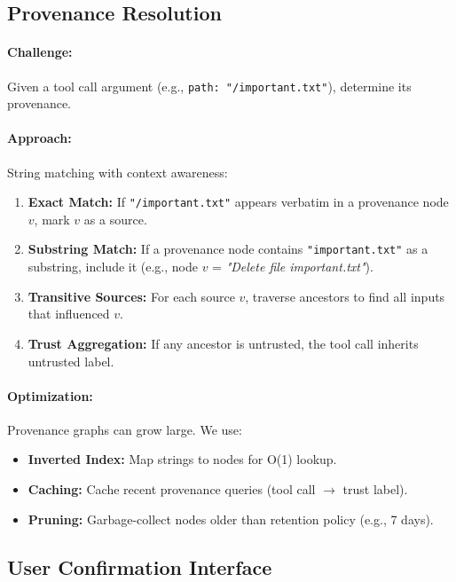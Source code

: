 \subsection{Provenance Resolution}

\paragraph{Challenge:} Given a tool call argument (e.g., \texttt{path: "/important.txt"}), determine
its provenance.

\paragraph{Approach:} String matching with context awareness:
\begin{enumerate}[leftmargin=1.2em]
  \item \textbf{Exact Match:} If \texttt{"/important.txt"} appears verbatim in a provenance node
        $v$, mark $v$ as a source.
  \item \textbf{Substring Match:} If a provenance node contains \texttt{"important.txt"} as a
        substring, include it (e.g., node $v$ = \textit{"Delete file important.txt"}).
  \item \textbf{Transitive Sources:} For each source $v$, traverse ancestors to find all inputs
        that influenced $v$.
  \item \textbf{Trust Aggregation:} If any ancestor is untrusted, the tool call inherits untrusted label.
\end{enumerate}

\paragraph{Optimization:} Provenance graphs can grow large. We use:
\begin{itemize}[leftmargin=1.2em]
  \item \textbf{Inverted Index:} Map strings to nodes for O(1) lookup.
  \item \textbf{Caching:} Cache recent provenance queries (tool call $\to$ trust label).
  \item \textbf{Pruning:} Garbage-collect nodes older than retention policy (e.g., 7 days).
\end{itemize}

\subsection{User Confirmation Interface}

